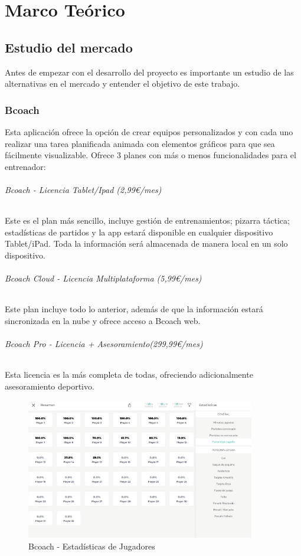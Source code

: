 
\chapter{Marco Teórico}
\label{marcoteorico} 

\section{Estudio del mercado}
Antes de empezar con el desarrollo del proyecto es importante un estudio de las alternativas en el mercado y entender el objetivo de este trabajo.

\subsection{Bcoach}
Esta aplicación ofrece la opción de crear equipos personalizados y con cada uno realizar una tarea planificada animada con elementos gráficos para que sea fácilmente visualizable. Ofrece 3 planes con más o menos funcionalidades para el entrenador:

\subparagraph{Bcoach - Licencia Tablet/Ipad (2,99€/mes)}
Este es el plan más sencillo, incluye gestión de entrenamientos; pizarra táctica; estadísticas de partidos y la app estará disponible en cualquier dispositivo Tablet/iPad. Toda la información será almacenada de manera local en un solo dispositivo.

\subparagraph{Bcoach Cloud - Licencia Multiplataforma (5,99€/mes)}
Este plan incluye todo lo anterior, además de que la información estará sincronizada en la nube y ofrece acceso a Bcoach web.

\subparagraph{Bcoach Pro - Licencia + Asesoramiento(299,99€/mes)}
Esta licencia es la más completa de todas, ofreciendo adicionalmente asesoramiento deportivo.

\begin{figure}[H]
    \centering
    \includegraphics[width=10cm]{archivos/tfg_jorge/bcoach_ests_jugadores}
    \caption{Bcoach - Estadísticas de Jugadores}\label{sistemass2}
\end{figure}

